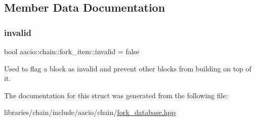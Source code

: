 \subsection{Member Data Documentation}
\mbox{\label{structaacio_1_1chain_1_1fork__item_a53c5fc406e0945f419355f0f76b76992}} 
\subsubsection{\texorpdfstring{invalid}{invalid}}
{\footnotesize\ttfamily bool aacio\+::chain\+::fork\+\_\+item\+::invalid = false}

Used to flag a block as invalid and prevent other blocks from building on top of it. 

The documentation for this struct was generated from the following file\+:\begin{DoxyCompactItemize}
\item 
libraries/chain/include/aacio/chain/\mbox{\hyperlink{fork__database_8hpp}{fork\+\_\+database.\+hpp}}\end{DoxyCompactItemize}
